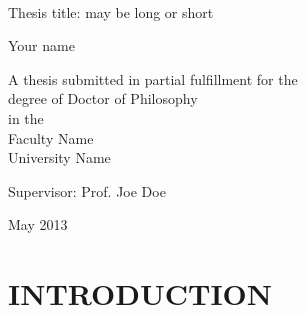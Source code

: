 \documentclass[12pt,a4paper,oldfontcommands]{memoir}
\begin{document}
%
%
\thispagestyle{empty}

{%
\sffamily
\centering
\Large

~\vspace{\fill}

{\huge 
Thesis title: may be long or short
}

\vspace{2.5cm}

{\LARGE
Your name
}

\vspace{3.5cm}

A thesis submitted in partial fulfillment for the\\
degree of Doctor of Philosophy\\[1em]
in the\\[1em]
Faculty Name\\
University Name

\vspace{3.5cm}

Supervisor: Prof. Joe Doe

\vspace{\fill}

May 2013

}%

\cleardoublepage

\tableofcontents*

\newpage
\listoffigures
\newpage
\listoftables
\clearpage


\chapter{INTRODUCTION}
\end{document}
